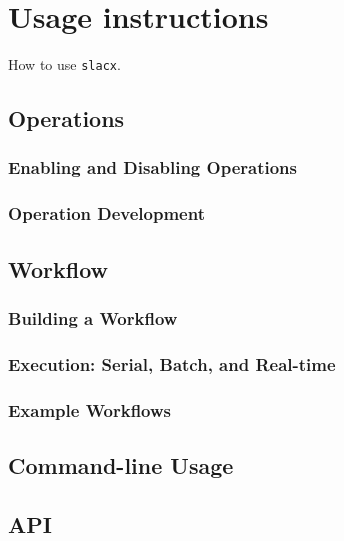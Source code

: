 \section{Usage instructions}
\label{sec:usage}

How to use \verb|slacx|.


\subsection{Operations}

\subsubsection{Enabling and Disabling Operations}

\subsubsection{Operation Development}


\subsection{Workflow}

\subsubsection{Building a Workflow}

\subsubsection{Execution: Serial, Batch, and Real-time}

\subsubsection{Example Workflows}


\subsection{Command-line Usage}

\subsection{API}



